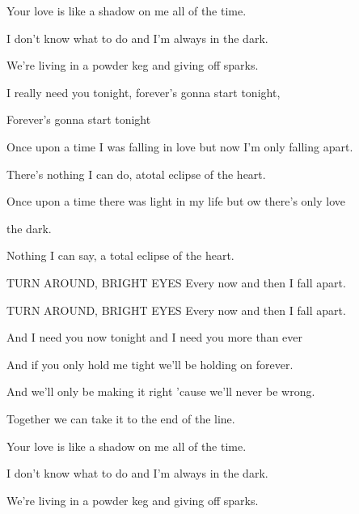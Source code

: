 Your love is like a shadow on me all of the time.

I don't know what to do and I'm always in the dark.

We're living in a powder keg and giving off sparks.

I really need you tonight, forever's gonna start tonight,

Forever's gonna start tonight

Once upon a time I was falling in love but now I'm only falling apart.

There's nothing I can do, atotal eclipse of the heart.

  

Once upon a time there was light in my life but ow there's only love

the dark.

Nothing I can say, a total eclipse of the heart.

 

 

 

 

TURN AROUND, BRIGHT EYES Every now and then I fall apart.

TURN AROUND, BRIGHT EYES Every now and then I fall apart.

And I need you now tonight and I need you more than ever

And if you only hold me tight we'll be holding on forever.

And we'll only be making it right 'cause we'll never be wrong.

Together we can take it to the end of the line.

Your love is like a shadow on me all of the time.

I don't know what to do and I'm always in the dark.

We're living in a powder keg and giving off sparks.


